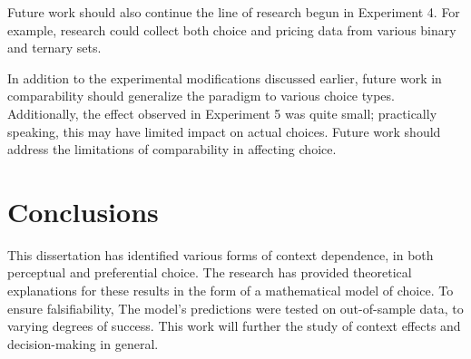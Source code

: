 Future work should also continue the line of research begun in Experiment 4. For example, research could collect both choice and pricing data from various binary and ternary sets. 

In addition to the experimental modifications discussed earlier, future work in comparability should generalize the paradigm to various choice types. Additionally, the effect observed in Experiment 5 was quite small; practically speaking, this may have limited impact on actual choices. Future work should address the limitations of comparability in affecting choice.

\section{Conclusions}
This dissertation has identified various forms of context dependence, in both perceptual and preferential choice. The research has provided theoretical explanations for these results in the form of a mathematical model of choice. To ensure falsifiability, The model's predictions were tested on out-of-sample data, to varying degrees of success. This work will further the study of context effects and decision-making in general. 